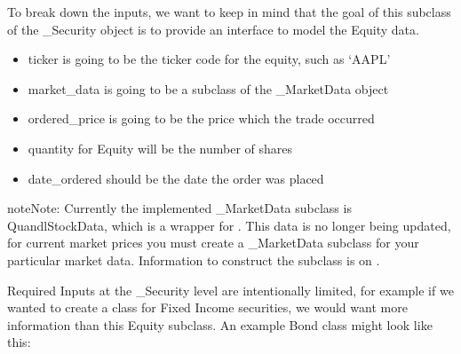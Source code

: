 \documentclass[letterpaper,10pt,english]{sphinxmanual}
\begin{document}
To break down the inputs, we want to keep in mind that the goal of this
subclass of the \_Security object is to provide an interface to model
the Equity data.
\begin{itemize}
\item {} 
ticker is going to be the ticker code for the equity, such as ‘AAPL’

\item {} 
market\_data is going to be a subclass of the \_MarketData object

\item {} 
ordered\_price is going to be the price which the trade occurred

\item {} 
quantity for Equity will be the number of shares

\item {} 
date\_ordered should be the date the order was placed

\end{itemize}

\begin{sphinxadmonition}{note}{Note:}
Currently the implemented \_MarketData subclass is
QuandlStockData, which is a wrapper for . This data is no
longer being updated, for current market prices you must create a
\_MarketData subclass for your particular market data. Information
to construct the subclass is on .
\end{sphinxadmonition}

Required Inputs at the \_Security level are intentionally limited, for
example if we wanted to create a class for Fixed Income securities, we
would want more information than this Equity subclass. An example Bond
class might look like this:
\end{document}
